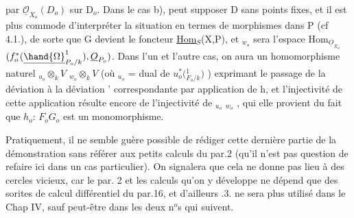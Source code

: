 
par $\underline{\mathcal{O}}_{X_o}(D_o)$ sur D$_o$. Dans le cas b),  peut supposer D sans points
fixes, et il est plus commode d'interpréter la situation en termes de
morphismes dans P (cf 4.1.), de sorte que G devient le foncteur
\underline{Hom}$_S$(X,P), et $_{w_o}$ sera l'espace  Hom$_{\underline{O}_{X_o}}$$(f_o^{*}(\underline{\hand{\Omega}}^{1}_{P_o/k}), \underline{O}_{P_o})$.
Dans l'un et l'autre cas, on aura un homomorphisme naturel
$_{u_o}\otimes_k V$ \hand{$\to$} $_{w_o}\otimes_k V$ (où $_{u_o}$ = dual de $u_o^{*}($\hand{$\Omega$}$^{1}_{F_o/k})$ ) exprimant le passage
de la déviation \hand{$\delta$} à la déviation \hand{$\delta$}' correspondante par application de h,
et l'injectivité de cette application résulte encore de l'injectivité
de $_{u_o}$\hand{$\to$} $_{w_o}$ , qui elle provient du fait que $h_o$: $F_o$\hand{$\to$}$G_o$ est un
monomorphisme.

Pratiquement, il ne semble guère possible de rédiger cette dernière
partie de la démonstration sans référer aux petits calculs du par.2
(qu'il n'est pas question de refaire ici dans un cas particulier). On
signalera que cela ne donne pas lieu à des cercles vicieux, car le par.
2  et les calculs qu'on y  développe ne dépend que des sorites
de calcul différentiel du par.16, et d'ailleurs .3. ne sera plus
utilisé dans le Chap IV, sauf peut-être dans les deux n$^{o}$s qui suivent.

